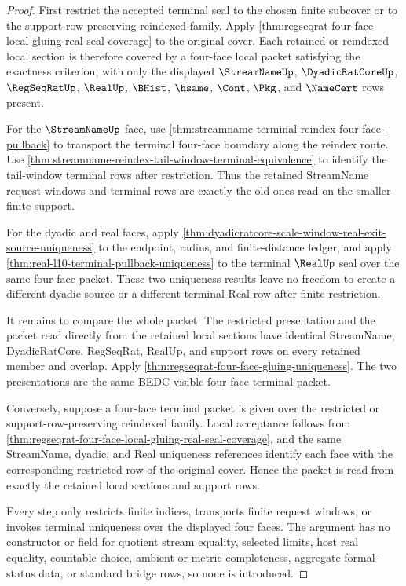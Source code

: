 \begin{proof}
First restrict the accepted terminal seal to the chosen finite subcover or
to the support-row-preserving reindexed family. Apply
\autoref{thm:regseqrat-four-face-local-gluing-real-seal-coverage} to the
original cover. Each retained or reindexed local section is therefore covered
by a four-face local packet satisfying the exactness criterion, with only the
displayed $\StreamNameUp$, $\DyadicRatCoreUp$, $\RegSeqRatUp$, $\RealUp$,
$\BHist$, $\hsame$, $\Cont$, $\Pkg$, and $\NameCert$ rows present.

For the $\StreamNameUp$ face, use
\autoref{thm:streamname-terminal-reindex-four-face-pullback} to transport the
terminal four-face boundary along the reindex route. Use
\autoref{thm:streamname-reindex-tail-window-terminal-equivalence} to identify
the tail-window terminal rows after restriction. Thus the retained
StreamName request windows and terminal rows are exactly the old ones read on
the smaller finite support.

For the dyadic and real faces, apply
\autoref{thm:dyadicratcore-scale-window-real-exit-source-uniqueness} to the
endpoint, radius, and finite-distance ledger, and apply
\autoref{thm:real-l10-terminal-pullback-uniqueness} to the terminal
$\RealUp$ seal over the same four-face packet. These two uniqueness results
leave no freedom to create a different dyadic source or a different terminal
Real row after finite restriction.

It remains to compare the whole packet. The restricted presentation and the
packet read directly from the retained local sections have identical
StreamName, DyadicRatCore, RegSeqRat, RealUp, and support rows on every
retained member and overlap. Apply
\autoref{thm:regseqrat-four-face-gluing-uniqueness}. The two presentations
are the same BEDC-visible four-face terminal packet.

Conversely, suppose a four-face terminal packet is given over the restricted
or support-row-preserving reindexed family. Local acceptance follows from
\autoref{thm:regseqrat-four-face-local-gluing-real-seal-coverage}, and the
same StreamName, dyadic, and Real uniqueness references identify each face
with the corresponding restricted row of the original cover. Hence the packet
is read from exactly the retained local sections and support rows.

Every step only restricts finite indices, transports finite request windows,
or invokes terminal uniqueness over the displayed four faces. The argument
has no constructor or field for quotient stream equality, selected limits,
host real equality, countable choice, ambient or metric completeness,
aggregate formal-status data, or standard bridge rows, so none is introduced.
\end{proof}

